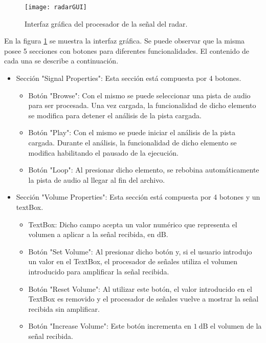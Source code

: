 \begin{figure}[htb]
 \centering
 \texttt{[image: radarGUI]}
 \caption{Interfaz gráfica del procesador de la señal del radar.}
 \label{fig:radarSnapshot}
\end{figure}
En la figura \ref{fig:radarSnapshot} se muestra la interfaz gráfica. Se puede observar que la misma posee 5 secciones con botones para diferentes funcionalidades. El contenido de cada una se describe a continuación.
\begin{itemize}
  \item Sección "Signal Properties": Esta sección está compuesta por 4 botones.
  \begin{itemize}
    \item Botón "Browse": Con el mismo se puede seleccionar una pista de audio para ser procesada. Una vez cargada, la funcionalidad de dicho elemento se modifica para detener el análisis de la pista cargada.

    \item Botón "Play": Con el mismo se puede iniciar el análisis de la pista cargada. Durante el análisis, la funcionalidad de dicho elemento se modifica habilitando el pausado de la ejecución.

    \item Botón "Loop": Al presionar dicho elemento, se rebobina automáticamente la pista de audio al llegar al fin del archivo.
  \end{itemize}

  \item Sección "Volume Properties": Esta sección está compuesta por 4 botones y un textBox.
  \begin{itemize}
    \item TextBox: Dicho campo acepta un valor numérico que representa el volumen a aplicar a la señal recibida, en $\si{\dB}$.

    \item Botón "Set Volume": Al presionar dicho botón y, si el usuario introdujo un valor en el TextBox, el procesador de señales utiliza el volumen introducido para amplificar la señal recibida.

    \item Botón "Reset Volume": Al utilizar este botón, el valor introducido en el TextBox es removido y el procesador de señales vuelve a mostrar la señal recibida sin amplificar.

    \item Botón "Increase Volume": Este botón incrementa en $\SI{1}{\dB}$ el volumen de la señal recibida.


\end{itemize}
\end{itemize}
